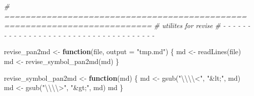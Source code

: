 \documentclass[
]{article}
\newenvironment{Shaded}{\begin{snugshade}}{\end{snugshade}}
\newcommand{\AttributeTok}[1]{\textcolor[rgb]{0.77,0.63,0.00}{#1}}
\newcommand{\CommentTok}[1]{\textcolor[rgb]{0.56,0.35,0.01}{\textit{#1}}}
\newcommand{\ControlFlowTok}[1]{\textcolor[rgb]{0.13,0.29,0.53}{\textbf{#1}}}
\newcommand{\FunctionTok}[1]{\textcolor[rgb]{0.00,0.00,0.00}{#1}}
\newcommand{\NormalTok}[1]{#1}
\newcommand{\OtherTok}[1]{\textcolor[rgb]{0.56,0.35,0.01}{#1}}
\newcommand{\SpecialCharTok}[1]{\textcolor[rgb]{0.00,0.00,0.00}{#1}}
\newcommand{\StringTok}[1]{\textcolor[rgb]{0.31,0.60,0.02}{#1}}
\begin{document}
\begin{Shaded}
\begin{Highlighting}[]
\CommentTok{\# ==========================================================================}
\CommentTok{\# utilites for revise}
\CommentTok{\# {-} {-} {-} {-} {-} {-} {-} {-} {-} {-} {-} {-} {-} {-} {-} {-} {-} {-} {-} {-} {-} {-} {-} {-} {-} {-} {-} {-} {-} {-} {-} {-} {-} {-} {-} {-} {-}}

\NormalTok{revise\_pan2md }\OtherTok{\textless{}{-}} \ControlFlowTok{function}\NormalTok{(file, }\AttributeTok{output =} \StringTok{"tmp.md"}\NormalTok{) \{}
\NormalTok{  md }\OtherTok{\textless{}{-}} \FunctionTok{readLines}\NormalTok{(file)}
\NormalTok{  md }\OtherTok{\textless{}{-}} \FunctionTok{revise\_symbol\_pan2md}\NormalTok{(md)}
\NormalTok{\}}

\NormalTok{revise\_symbol\_pan2md }\OtherTok{\textless{}{-}} \ControlFlowTok{function}\NormalTok{(md) \{}
\NormalTok{  md }\OtherTok{\textless{}{-}} \FunctionTok{gsub}\NormalTok{(}\StringTok{"}\SpecialCharTok{\textbackslash{}\textbackslash{}\textbackslash{}\textbackslash{}}\StringTok{\textless{}"}\NormalTok{, }\StringTok{"\&lt;"}\NormalTok{, md)}
\NormalTok{  md }\OtherTok{\textless{}{-}} \FunctionTok{gsub}\NormalTok{(}\StringTok{"}\SpecialCharTok{\textbackslash{}\textbackslash{}\textbackslash{}\textbackslash{}}\StringTok{\textgreater{}"}\NormalTok{, }\StringTok{"\&gt;"}\NormalTok{, md)}
\NormalTok{  md}
\NormalTok{\}}


\end{Highlighting}
\end{Shaded}
\end{document}
